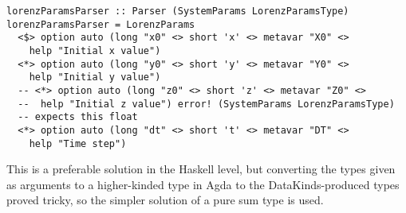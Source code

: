 \begin{verbatim}
lorenzParamsParser :: Parser (SystemParams LorenzParamsType)
lorenzParamsParser = LorenzParams
  <$> option auto (long "x0" <> short 'x' <> metavar "X0" <> 
    help "Initial x value")
  <*> option auto (long "y0" <> short 'y' <> metavar "Y0" <> 
    help "Initial y value")
  -- <*> option auto (long "z0" <> short 'z' <> metavar "Z0" <> 
  --  help "Initial z value") error! (SystemParams LorenzParamsType)
  -- expects this float
  <*> option auto (long "dt" <> short 't' <> metavar "DT" <> 
    help "Time step")
\end{verbatim}

This is a preferable solution in the Haskell level, but converting the types given as arguments to a higher-kinded type in Agda to the DataKinds-produced types proved tricky, so the simpler solution of a pure sum type is used.